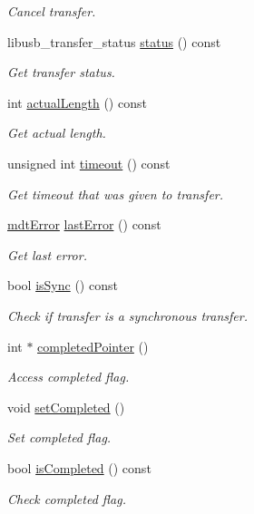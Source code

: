 \begin{DoxyCompactItemize}
\begin{DoxyCompactList}\small\item\em Cancel transfer. \end{DoxyCompactList}\item 
libusb\-\_\-transfer\-\_\-status \hyperlink{classmdt_usb_transfer_ab9ebc5c89217ec016975b45c8255fefe}{status} () const 
\begin{DoxyCompactList}\small\item\em Get transfer status. \end{DoxyCompactList}\item 
int \hyperlink{classmdt_usb_transfer_a75fe23ffc102c80494a14614f99e6188}{actual\-Length} () const 
\begin{DoxyCompactList}\small\item\em Get actual length. \end{DoxyCompactList}\item 
unsigned int \hyperlink{classmdt_usb_transfer_a3262511f6062348132e7ee689c24226c}{timeout} () const 
\begin{DoxyCompactList}\small\item\em Get timeout that was given to transfer. \end{DoxyCompactList}\item 
\hyperlink{classmdt_error}{mdt\-Error} \hyperlink{classmdt_usb_transfer_a0ec677bc1ccdaeb0ab581aaba82beb36}{last\-Error} () const 
\begin{DoxyCompactList}\small\item\em Get last error. \end{DoxyCompactList}\item 
bool \hyperlink{classmdt_usb_transfer_af13a31511f4eee9a6004e1979e5d7dea}{is\-Sync} () const 
\begin{DoxyCompactList}\small\item\em Check if transfer is a synchronous transfer. \end{DoxyCompactList}\item 
int $\ast$ \hyperlink{classmdt_usb_transfer_af62c1241b0eeba1d4bdf5b7f31387c57}{completed\-Pointer} ()
\begin{DoxyCompactList}\small\item\em Access completed flag. \end{DoxyCompactList}\item 
void \hyperlink{classmdt_usb_transfer_ac728b178ae4ce4845ae14269e72a7df9}{set\-Completed} ()
\begin{DoxyCompactList}\small\item\em Set completed flag. \end{DoxyCompactList}\item 
bool \hyperlink{classmdt_usb_transfer_a08051117e08a232e042467b3ca0b8649}{is\-Completed} () const 
\begin{DoxyCompactList}\small\item\em Check completed flag. \end{DoxyCompactList}\end{DoxyCompactItemize}
